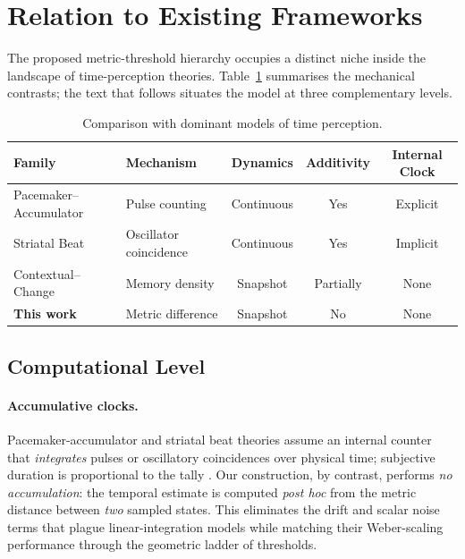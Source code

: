 \documentclass[11pt]{article}
\begin{document}
\section{Relation to Existing Frameworks}
The proposed metric-threshold hierarchy occupies a distinct niche
inside the landscape of time-perception theories.
Table~\ref{tab:comparison} summarises the mechanical contrasts; the
text that follows situates the model at three complementary levels.

\begin{table}[ht]
    \centering
    \small
    \begin{tabular}{@{}p{}p{}ccc@{}}
        \toprule
        \textbf{Family} & \textbf{Mechanism} & \textbf{Dynamics} & \textbf{Additivity} & \textbf{Internal Clock} \\
        \midrule
        Pacemaker--Accumulator & Pulse counting & Continuous & Yes & Explicit \\
        Striatal Beat & Oscillator coincidence & Continuous & Yes & Implicit \\
        Contextual--Change & Memory density & Snapshot & Partially & None \\
        \textbf{This work} & Metric difference & Snapshot & No & None \\
        \bottomrule
    \end{tabular}
    \caption{Comparison with dominant models of time perception.}
    \label{tab:comparison}
\end{table}

\subsection{Computational Level}
\paragraph{Accumulative clocks.}
Pacemaker-accumulator and striatal beat theories assume an internal
counter that \emph{integrates} pulses or oscillatory coincidences over
physical time; subjective duration is proportional to the tally
\citep{gibbonscalar,miallbeat}.  Our construction, by contrast, performs
\emph{no accumulation}: the temporal estimate is computed
\emph{post hoc} from the metric distance between \emph{two} sampled
states.  This eliminates the drift and scalar noise terms that plague
linear-integration models while matching their Weber-scaling performance
through the geometric ladder of thresholds.
\end{document}
